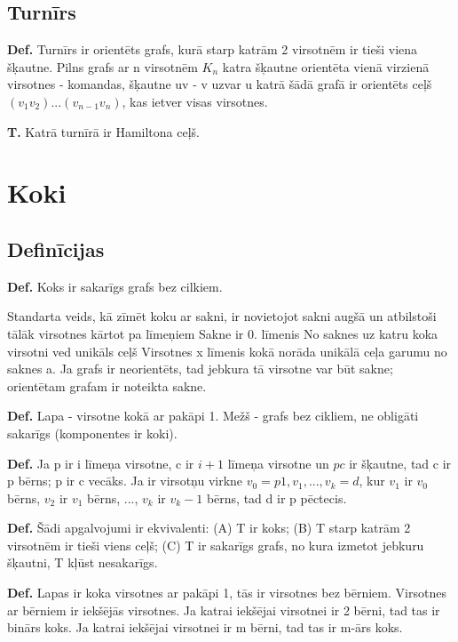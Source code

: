 \documentclass{article}
\begin{document}
\subsection{Turnīrs}

\textbf{Def.}  Turnīrs ir orientēts grafs, kurā starp katrām 2 virsotnēm ir tieši viena šķautne. Pilns grafs ar n virsotnēm $K_n$ katra šķautne orientēta vienā virzienā virsotnes - komandas, šķautne uv - v uzvar u katrā šādā grafā ir orientēts ceļš $(v_1 v_2 )...(v_{n−1} v_n )$, kas ietver visas virsotnes.

\textbf{T. } Katrā turnīrā ir Hamiltona ceļš.

\section{Koki}

\subsection{Definīcijas}

\textbf{Def.}  Koks ir sakarīgs grafs bez cilkiem.

Standarta veids, kā zīmēt koku ar sakni, ir novietojot sakni augšā un atbilstoši tālāk virsotnes kārtot pa līmeņiem Sakne ir 0. līmenis No saknes uz katru koka virsotni ved unikāls ceļš Virsotnes x līmenis kokā norāda unikālā ceļa garumu no saknes a.  Ja grafs ir neorientēts, tad jebkura tā virsotne var būt sakne; orientētam grafam ir noteikta sakne.

\textbf{Def.}  Lapa - virsotne kokā ar pakāpi 1.  Mežš - grafs bez cikliem, ne obligāti sakarīgs (komponentes ir koki).

\textbf{Def.}  Ja p ir i līmeņa virsotne, c ir $i + 1$ līmeņa virsotne un $pc$ ir šķautne, tad c ir p bērns; p ir c vecāks.  Ja ir virsotņu virkne $v_0 = p1 , v_1 , ..., v_k = d$, kur $v_1$ ir $v_0$ bērns, $v_2$ ir $v_1$ bērns, ..., $v_k$ ir $v_k −1$ bērns, tad d ir p pēctecis.

\textbf{Def.}  Šādi apgalvojumi ir ekvivalenti: (A) T ir koks; (B) T starp katrām 2 virsotnēm ir tieši viens ceļš; (C) T ir sakarīgs grafs, no kura izmetot jebkuru šķautni, T kļūst nesakarīgs. 

\textbf{Def.}  Lapas ir koka virsotnes ar pakāpi 1, tās ir virsotnes bez bērniem.  Virsotnes ar bērniem ir iekšējās virsotnes.  Ja katrai iekšējai virsotnei ir 2 bērni, tad tas ir binārs koks.  Ja katrai iekšējai virsotnei ir m bērni, tad tas ir m-ārs koks.
\end{document}
